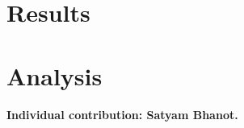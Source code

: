 \documentclass[11pt,twocolumn]{article}
\begin{document}
\wsoneIntro
\wsoneDataset
\wsoneDesign
\section{Results}
\wsoneResults
\section{Analysis}
\wsoneAnalysis
\paragraph{Individual contribution: Satyam Bhanot.}
\wsoneContribution
\end{document}
